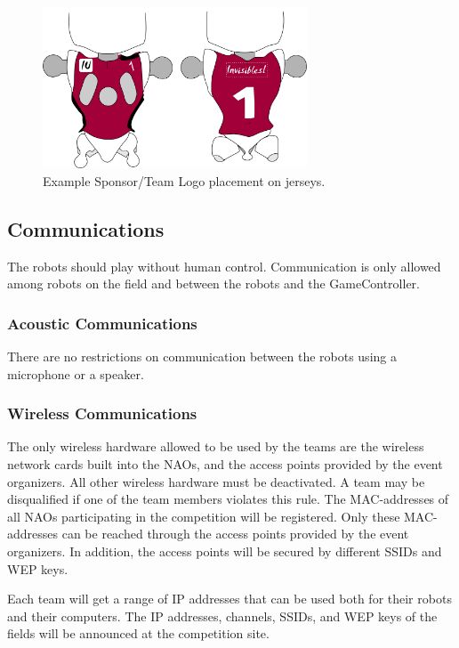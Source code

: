 \documentclass[12pt]{article}
\begin{document}
\begin{figure}
\centerline{
\includegraphics[width=0.7\textwidth]{figs/jersey-logo.pdf}}
\caption{Example Sponsor/Team Logo placement on jerseys.}
\label{fig:sponsor_jersey}
\end{figure}


\subsection{Communications}

The robots should play without human control. Communication is only allowed among robots on the field and between the robots and the GameController.

\subsubsection{Acoustic Communications}

There are no restrictions on communication between the robots using a microphone or a speaker.

\subsubsection{Wireless Communications}
\label{sec:wireless}
The only wireless hardware allowed to be used by the teams are the wireless network cards built into the NAOs, and the access points provided by the event organizers. All other wireless hardware must be deactivated. A team may be disqualified if one of the team members violates this rule. The MAC-addresses of all NAOs participating in the competition will be registered. Only these MAC-addresses can be reached through the access points provided by the event organizers. In addition, the access points will be secured by different SSIDs and WEP keys. 

Each team will get a range of IP addresses that can be used both for their robots and their computers. The IP addresses, channels, SSIDs, and WEP keys of the fields will be announced at the competition site.
\end{document}
